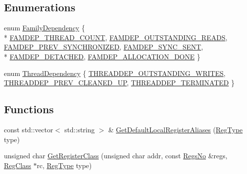 \subsection*{Enumerations}
\begin{DoxyCompactItemize}
\item 
enum \hyperlink{namespace_simulator_1_1drisc_ac6be077f11d2c5eb93b6ce2371bf67f4}{Family\+Dependency} \{ \\*
\hyperlink{namespace_simulator_1_1drisc_ac6be077f11d2c5eb93b6ce2371bf67f4aa7d68fb7afa5b11193ed6d2a860c4c3e}{F\+A\+M\+D\+E\+P\+\_\+\+T\+H\+R\+E\+A\+D\+\_\+\+C\+O\+U\+N\+T}, 
\hyperlink{namespace_simulator_1_1drisc_ac6be077f11d2c5eb93b6ce2371bf67f4a18465799d336613f56d5532ddf2fe792}{F\+A\+M\+D\+E\+P\+\_\+\+O\+U\+T\+S\+T\+A\+N\+D\+I\+N\+G\+\_\+\+R\+E\+A\+D\+S}, 
\hyperlink{namespace_simulator_1_1drisc_ac6be077f11d2c5eb93b6ce2371bf67f4a58ca122d85b666e048e5b80dd59d450d}{F\+A\+M\+D\+E\+P\+\_\+\+P\+R\+E\+V\+\_\+\+S\+Y\+N\+C\+H\+R\+O\+N\+I\+Z\+E\+D}, 
\hyperlink{namespace_simulator_1_1drisc_ac6be077f11d2c5eb93b6ce2371bf67f4a6959c4afd9b5cfdd998784ca8ec662c1}{F\+A\+M\+D\+E\+P\+\_\+\+S\+Y\+N\+C\+\_\+\+S\+E\+N\+T}, 
\\*
\hyperlink{namespace_simulator_1_1drisc_ac6be077f11d2c5eb93b6ce2371bf67f4a59e54efc2dbccaf39ba0873dd20a7844}{F\+A\+M\+D\+E\+P\+\_\+\+D\+E\+T\+A\+C\+H\+E\+D}, 
\hyperlink{namespace_simulator_1_1drisc_ac6be077f11d2c5eb93b6ce2371bf67f4a91a4043b9131ea06b18b60ae5fc2d607}{F\+A\+M\+D\+E\+P\+\_\+\+A\+L\+L\+O\+C\+A\+T\+I\+O\+N\+\_\+\+D\+O\+N\+E}
 \}
\item 
enum \hyperlink{namespace_simulator_1_1drisc_ad6854da07c57895c7a56c85e725e9efa}{Thread\+Dependency} \{ \hyperlink{namespace_simulator_1_1drisc_ad6854da07c57895c7a56c85e725e9efaac757f31f8c091b7f9364881a5b824ab2}{T\+H\+R\+E\+A\+D\+D\+E\+P\+\_\+\+O\+U\+T\+S\+T\+A\+N\+D\+I\+N\+G\+\_\+\+W\+R\+I\+T\+E\+S}, 
\hyperlink{namespace_simulator_1_1drisc_ad6854da07c57895c7a56c85e725e9efaafb6bf723553e6b7ccc5623b473537bca}{T\+H\+R\+E\+A\+D\+D\+E\+P\+\_\+\+P\+R\+E\+V\+\_\+\+C\+L\+E\+A\+N\+E\+D\+\_\+\+U\+P}, 
\hyperlink{namespace_simulator_1_1drisc_ad6854da07c57895c7a56c85e725e9efaaf3c34b87e4edcb3ae36b3da570568ba4}{T\+H\+R\+E\+A\+D\+D\+E\+P\+\_\+\+T\+E\+R\+M\+I\+N\+A\+T\+E\+D}
 \}
\end{DoxyCompactItemize}
\subsection*{Functions}
\begin{DoxyCompactItemize}
\item 
const std\+::vector$<$ std\+::string $>$ \& \hyperlink{namespace_simulator_1_1drisc_a7b9fb384103083b1aa85dab795649ec2}{Get\+Default\+Local\+Register\+Aliases} (\hyperlink{namespace_simulator_ab86b74f4b95732ea63178d829b189acb}{Reg\+Type} type)
\item 
unsigned char \hyperlink{namespace_simulator_1_1drisc_a1d5f90abc637bb4ad07daa78682b7fa2}{Get\+Register\+Class} (unsigned char addr, const \hyperlink{struct_simulator_1_1_regs_no}{Regs\+No} \&regs, \hyperlink{namespace_simulator_aed8a64878dc9a85785a9289468470a77}{Reg\+Class} $\ast$rc, \hyperlink{namespace_simulator_ab86b74f4b95732ea63178d829b189acb}{Reg\+Type} type)
\end{DoxyCompactItemize}


